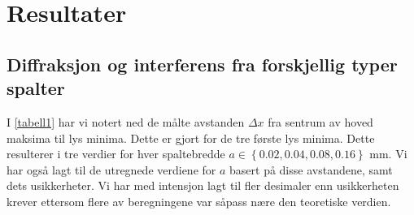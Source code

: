 \documentclass[reprint,norsk,notitlepage,floatfix]{revtex4-2}
\begin{document}
    

\section{Resultater} \label{sec: resultater} 
  \subsection{Diffraksjon og interferens fra forskjellig typer spalter}
  
  I \cref{tabell1} har vi notert ned de målte avstanden $Δx$ fra sentrum av hoved maksima til lys minima. Dette er gjort for de tre første lys minima. Dette resulterer i tre verdier for hver spaltebredde $a ∈ \left\{0.02, 0.04, 0.08, 0.16\right\}$ mm. Vi har også lagt til de utregnede verdiene for $a$ basert på disse avstandene, samt dets usikkerheter. Vi har med intensjon lagt til fler desimaler enn usikkerheten krever ettersom flere av beregningene var såpass nære den teoretiske verdien. 
  
\end{document}

